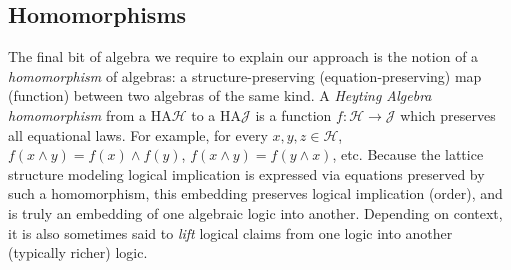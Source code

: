 \documentclass[11pt,a4paper,acceptedWithA]{article}
\newcommand{\ha}{\textsc{HA}\xspace}
\begin{document}
\subsection{Homomorphisms}
The final bit of algebra we require to explain our approach is the notion of a \emph{homomorphism} of algebras: a structure-preserving (equation-preserving) map (function) between two algebras of the same kind.
A \emph{Heyting Algebra homomorphism} from a \ha $\mathcal{H}$ to a \ha $\mathcal{J}$ is a function $f:\mathcal{H}\rightarrow\mathcal{J}$ which preserves all equational laws. For example, for every $x,y,z\in\mathcal{H}$, $f(x\land y)=f(x)\land f(y)$, $f(x\land y)=f(y\land x)$, etc. Because the lattice structure modeling logical implication is expressed via equations preserved by such a homomorphism, this embedding preserves logical implication (order), and is truly an embedding of one algebraic logic into another. Depending on context, it is also sometimes said to \emph{lift} logical claims from one logic into another (typically richer) logic.
\end{document}
